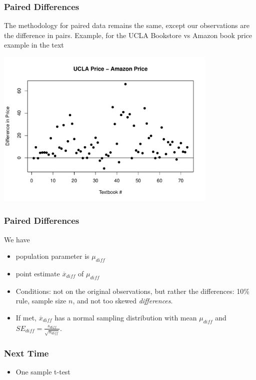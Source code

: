 \documentclass[slides]{beamer}
\newcommand{\blue}[1]{\textcolor{blue2}{#1}}
\newcommand{\xbar}{\overline{x}}
\begin{document}
\begin{frame}[fragile]
\frametitle{Paired Differences}
The methodology for paired data remains the same, except our \blue{observations} are the difference in pairs.  Example, for the UCLA Bookstore vs Amazon book price example in the text
\begin{center}
\includegraphics[width=0.8\textwidth]{figure/diff2.pdf}
\end{center}


\end{frame}


\begin{frame}[fragile]
\frametitle{Paired Differences}
We have
\begin{itemize}
\pause \item population parameter is $\mu_{diff}$
\pause \item point estimate $\xbar_{diff}$ of $\mu_{diff}$
\pause \item Conditions: not on the original observations, but rather the \blue{differences}:  10\% rule, sample size $n$, and not too skewed \textit{differences}.
\pause \item If met,  $\xbar_{diff}$ has a normal sampling distribution with mean $\mu_{diff}$ and $SE_{diff} = \frac{s_{diff}}{\sqrt{n_{diff}}}$.  
\end{itemize}


\end{frame}


\begin{frame}[fragile]
\frametitle{Next Time}

\begin{itemize}
\item One sample t-test
\end{itemize}


\end{frame}
\end{document}
